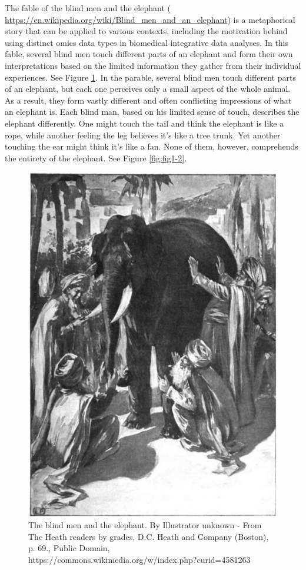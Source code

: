 \documentclass[a4paper, nobind]{templates/ociamthesis}
\begin{document}
The fable of the blind men and the elephant ( \url{https://en.wikipedia.org/wiki/Blind_men_and_an_elephant}) is a metaphorical story that can be applied to various contexts, including the motivation behind using distinct omics data types in biomedical integrative data analyses. In this fable, several blind men touch different parts of an elephant and form their own interpretations based on the limited information they gather from their individual experiences. See Figure \ref{fig:fig1-1}. In the parable, several blind men touch different parts of an elephant, but each one perceives only a small aspect of the whole animal. As a result, they form vastly different and often conflicting impressions of what an elephant is. Each blind man, based on his limited sense of touch, describes the elephant differently. One might touch the tail and think the elephant is like a rope, while another feeling the leg believes it's like a tree trunk. Yet another touching the ear might think it's like a fan. None of them, however, comprehends the entirety of the elephant. See Figure \ref{fig:fig1-2}.

\begin{figure}

{\centering \includegraphics[width=0.95\linewidth]{figures/chapter1/1-1_blind_men} 

}

\caption[The blind men and the elephant]{The blind men and the elephant. By Illustrator unknown - From The Heath readers by grades, D.C. Heath and Company (Boston), p. 69., Public Domain, https://commons.wikimedia.org/w/index.php?curid=4581263}\label{fig:fig1-1}
\end{figure}
\end{document}
